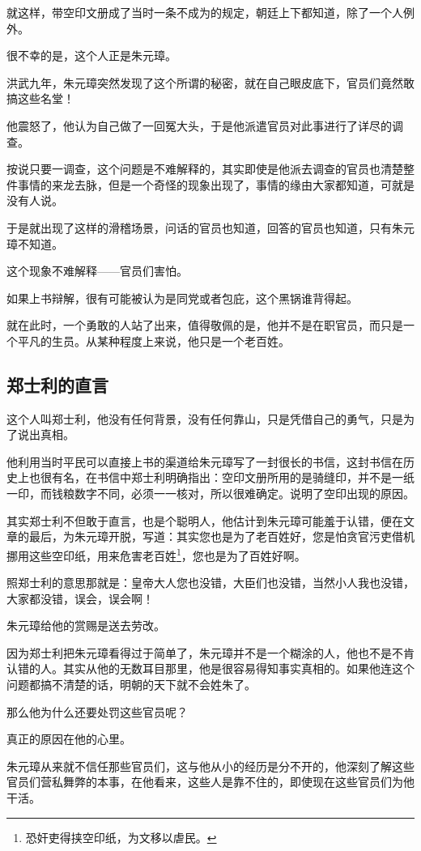 \begin{multicols}{\theparacolNo}
		就这样，带空印文册成了当时一条不成为的规定，朝廷上下都知道，除了一个人例外。

		很不幸的是，这个人正是朱元璋。

		洪武九年，朱元璋突然发现了这个所谓的秘密，就在自己眼皮底下，官员们竟然敢搞这些名堂！

		他震怒了，他认为自己做了一回冤大头，于是他派遣官员对此事进行了详尽的调查。

		按说只要一调查，这个问题是不难解释的，其实即使是他派去调查的官员也清楚整件事情的来龙去脉，但是一个奇怪的现象出现了，事情的缘由大家都知道，可就是没有人说。

		于是就出现了这样的滑稽场景，问话的官员也知道，回答的官员也知道，只有朱元璋不知道。

		这个现象不难解释——官员们害怕。

		如果上书辩解，很有可能被认为是同党或者包庇，这个黑锅谁背得起。

		就在此时，一个勇敢的人站了出来，值得敬佩的是，他并不是在职官员，而只是一个平凡的生员。从某种程度上来说，他只是一个老百姓。

		\subsection{郑士利的直言}
		这个人叫郑士利，他没有任何背景，没有任何靠山，只是凭借自己的勇气，只是为了说出真相。

		他利用当时平民可以直接上书的渠道给朱元璋写了一封很长的书信，这封书信在历史上也很有名，在书信中郑士利明确指出：空印文册所用的是骑缝印，并不是一纸一印，而钱粮数字不同，必须一一核对，所以很难确定。说明了空印出现的原因。

		其实郑士利不但敢于直言，也是个聪明人，他估计到朱元璋可能羞于认错，便在文章的最后，为朱元璋开脱，写道：其实您也是为了老百姓好，您是怕贪官污吏借机挪用这些空印纸，用来危害老百姓\footnote{恐奸吏得挟空印纸，为文移以虐民。}，您也是为了百姓好啊。

		照郑士利的意思那就是：皇帝大人您也没错，大臣们也没错，当然小人我也没错，大家都没错，误会，误会啊！

		朱元璋给他的赏赐是送去劳改。

		因为郑士利把朱元璋看得过于简单了，朱元璋并不是一个糊涂的人，他也不是不肯认错的人。其实从他的无数耳目那里，他是很容易得知事实真相的。如果他连这个问题都搞不清楚的话，明朝的天下就不会姓朱了。

		那么他为什么还要处罚这些官员呢？

		真正的原因在他的心里。

		朱元璋从来就不信任那些官员们，这与他从小的经历是分不开的，他深刻了解这些官员们营私舞弊的本事，在他看来，这些人是靠不住的，即使现在这些官员们为他干活。


\end{multicols}
